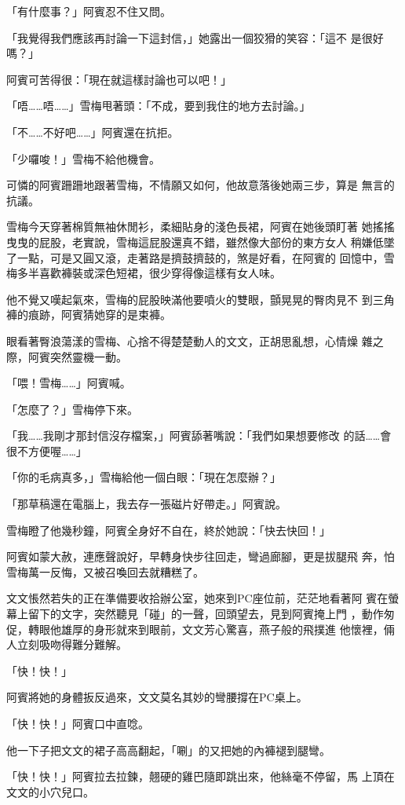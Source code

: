 「有什麼事？」阿賓忍不住又問。

「我覺得我們應該再討論一下這封信，」她露出一個狡猾的笑容：「這不
是很好嗎？」

阿賓可苦得很：「現在就這樣討論也可以吧！」

「唔……唔……」雪梅甩著頭：「不成，要到我住的地方去討論。」

「不……不好吧……」阿賓還在抗拒。

「少囉唆！」雪梅不給他機會。

可憐的阿賓跚跚地跟著雪梅，不情願又如何，他故意落後她兩三步，算是
無言的抗議。

雪梅今天穿著棉質無袖休閒衫，柔細貼身的淺色長裙，阿賓在她後頭盯著
她搖搖曳曳的屁股，老實說，雪梅這屁股還真不錯，雖然像大部份的東方女人
稍嫌低墜了一點，可是又圓又滾，走著路是擠鼓擠鼓的，煞是好看，在阿賓的
回憶中，雪梅多半喜歡褲裝或深色短裙，很少穿得像這樣有女人味。

他不覺又嘆起氣來，雪梅的屁股映滿他要噴火的雙眼，顫晃晃的臀肉見不
到三角褲的痕跡，阿賓猜她穿的是束褲。

眼看著臀浪蕩漾的雪梅、心捨不得楚楚動人的文文，正胡思亂想，心情燥
雜之際，阿賓突然靈機一動。

「喂！雪梅……」阿賓喊。

「怎麼了？」雪梅停下來。

「我……我剛才那封信沒存檔案，」阿賓舔著嘴說：「我們如果想要修改
的話……會很不方便喔……」

「你的毛病真多，」雪梅給他一個白眼：「現在怎麼辦？」

「那草稿還在電腦上，我去存一張磁片好帶走。」阿賓說。

雪梅瞪了他幾秒鐘，阿賓全身好不自在，終於她說：「快去快回！」

阿賓如蒙大赦，連應聲說好，早轉身快步往回走，彎過廊腳，更是拔腿飛
奔，怕雪梅萬一反悔，又被召喚回去就糟糕了。

文文悵然若失的正在準備要收拾辦公室，她來到PC座位前，茫茫地看著阿
賓在螢幕上留下的文字，突然聽見「碰」的一聲，回頭望去，見到阿賓掩上門
，動作匆促，轉眼他雄厚的身形就來到眼前，文文芳心驚喜，燕子般的飛撲進
他懷裡，倆人立刻吸吻得難分難解。

「快！快！」

阿賓將她的身體扳反過來，文文莫名其妙的彎腰撐在PC桌上。

「快！快！」阿賓口中直唸。

他一下子把文文的裙子高高翻起，「唰」的又把她的內褲褪到腿彎。

「快！快！」阿賓拉去拉鍊，翹硬的雞巴隨即跳出來，他絲毫不停留，馬
上頂在文文的小穴兒口。

